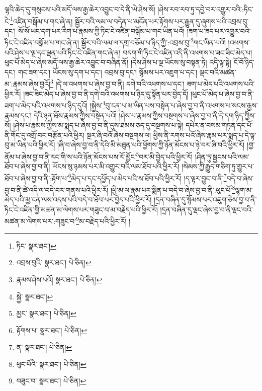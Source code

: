 ལྷའི་ཆེད་དུ་གསུངས་པའི་མདོ་ལས་རྒྱ་ཆེར་འབྱུང་བ་དེ་ནི་ཡེ་ཤེས་སོ། །ཤེས་རབ་རབ་ཏུ་དབྱེ་བར་འགྱུར་བའི་:ཏིང་ངེ་\footnote{ཏིང་  སྣར་ཐང་། }འཛིན་བསྒོམ་པ་གང་ཞེ་ན། སྦྱོར་བའི་ལམ་ལ་བདེན་པ་མངོན་པར་རྟོགས་པར་རྒྱུན་དུ་ཞུགས་པའི་འབྲས་བུ་དང་། སོ་སོ་ཡང་དག་པར་རིག་པ་རྣམས་ཀྱི་ཏིང་ངེ་འཛིན་བསྒོམ་པ་གང་ཡིན་པའོ། །ཟག་པ་ཟད་པར་འགྱུར་བའི་ཏིང་ངེ་འཛིན་བསྒོམ་པ་གང་ཞེ་ན། སྦྱོར་བའི་ལམ་ལ་དགྲ་བཅོམ་པ་ཉིད་ཀྱི་:འབྲས་བུ་\footnote{འབྲས་བུའི་  སྣར་ཐང་།  པེ་ཅིན། }གང་ཡིན་པའོ། །འཕགས་པའི་ཤེས་པ་ལྔ་དང་ལྡན་པའི་ཏིང་ངེ་འཛིན་གང་ཞེ་ན། བདག་གི་ཏིང་ངེ་འཛིན་འདི་ནི་འཕགས་པ་ཟང་ཟིང་མེད་པ། ཕུང་པོ་མེད་པ་ཞེས་མདོ་ལས་རྒྱ་ཆེར་འབྱུང་བ་བཞིན་ནོ། །དེས་ཤེས་པ་ལྔ་ཡོངས་སུ་བསྟན་ཏེ། འདི་ལྟ་སྟེ། ངོ་བོ་ཉིད་དང་། གང་ཟག་དང་། ཡོངས་སུ་དག་པ་དང་། འབྲས་བུ་དང་། སྙོམས་པར་འཇུག་པ་དང་། ལྡང་བའི་མཚན་མ་:རྣམས་ཞེས་བྱའོ།\footnote{རྣམས་ཤེས་པའོ།  སྣར་ཐང་།  པེ་ཅིན། } །དེ་ལ་འཕགས་པ་ཞེས་བྱ་བ་ནི། དགེ་བའི་འཕགས་པ་དང་། ཟག་པ་མེད་པའི་འཕགས་པའི་ཕྱིར་རོ། །ཟང་ཟིང་མེད་པ་ཞེས་བྱ་བ་ནི་དགེ་བའི་འཕགས་པ་ཉིད་དུ་སྟོན་པར་བྱེད་དོ། །ཕུང་པོ་མེད་པ་ཞེས་བྱ་བ་ནི་ཟག་པ་མེད་པའི་འཕགས་པ་ཉིད་དུའོ། །སྐྱེས་\footnote{སྐྱེ་  སྣར་ཐང་། }བུ་ངན་པ་མ་ཡིན་པས་བསྟེན་པ་ཞེས་བྱ་བ་ནི་འཕགས་པ་སངས་རྒྱས་རྣམས་དང་། དེའི་ཉན་ཐོས་རྣམས་ཀྱིས་བསྟེན་པའོ། །ཤེས་པ་རྣམས་ཀྱིས་བསྔགས་པ་ཞེས་བྱ་བ་ནི་དེ་དག་ཉིད་ཀྱིས་སོ། །ཤེས་པ་རྣམས་ཀྱིས་མ་སྨད་པ་ཞེས་བྱ་བ་ནི་དུས་ཐམས་ཅད་དུ་བསྔགས་པ་སྟེ། དཔེར་ན་བསམ་གཏན་དང་པོ་ནི་གོང་དུ་འགྲོ་བར་བརྩོན་པའི་ཕྱིར། སྔར་ཞི་བའོ་ཞེས་བསྔགས་ལ། ཕྱིས་ནི་རགས་པའོ་ཞེས་རྣམ་པར་སྨད་པ་དེ་ལྟ་བུ་མ་ཡིན་པའི་ཕྱིར་རོ། །ཞི་བ་ཞེས་བྱ་བ་ནི་དེའི་མི་མཐུན་པའི་ཕྱོགས་ཀྱི་ཉོན་མོངས་པ་ཉེ་བར་ཞི་བའི་ཕྱིར་རོ། །གྱ་ནོམ་པ་ཞེས་བྱ་བ་ནི་རང་གི་ས་པའི་ཉོན་མོངས་པས་རོ་མྱོང་\footnote{མྱང་  སྣར་ཐང་།  པེ་ཅིན། }བར་མི་བྱེད་པའི་ཕྱིར་རོ། །ཤིན་ཏུ་སྦྱངས་པའི་ལམ་ཐོབ་པ་ཞེས་བྱ་བ་ནི། ཡོངས་སུ་ཉམས་པར་མི་འགྱུར་བའི་ལམ་ཐོབ་པའི་ཕྱིར་རོ། །སེམས་ཀྱི་རྒྱུད་གཅིག་ཏུ་གྱུར་པ་ཐོབ་པ་ཞེས་བྱ་བ་ནི་:རྟོག་པ་\footnote{རྟོགས་པ་  སྣར་ཐང་།  པེ་ཅིན། }མེད་པ་དང་དཔྱོད་པ་མེད་པའི་ས་ཐོབ་པའི་ཕྱིར་རོ། །ད་ལྟར་བྱུང་བ་ནི་\footnote{ན་  སྣར་ཐང་།  པེ་ཅིན། }བདེ་བ་ཞེས་བྱ་བ་ནི་ཚེ་འདི་ལ་བདེ་བར་གནས་པའི་ཕྱིར་རོ། །ཕྱི་མ་ལ་རྣམ་པར་སྨིན་པ་བདེ་བ་ཞེས་བྱ་བ་ནི་:ཕུང་པོ་\footnote{ཕུང་པོའི་  སྣར་ཐང་།  པེ་ཅིན། }ལྷག་མ་མེད་པའི་མྱ་ངན་ལས་འདས་པའི་བདེ་བ་ཐོབ་པར་བྱེད་པའི་ཕྱིར་རོ། །དྲན་བཞིན་དུ་སྙོམས་པར་འཇུག་ཅེས་བྱ་བ་ནི་ཏིང་ངེ་འཛིན་གྱི་མཚན་མ་ལེགས་པར་གཟུང་བ་མ་བརྗེད་པའི་ཕྱིར་རོ། །དྲན་བཞིན་དུ་ལྡང་ཞེས་བྱ་བ་ནི་ལྡང་བའི་མཚན་མ་ལེགས་པར་:གཟུང་བ་\footnote{བཟུང་བ་  སྣར་ཐང་།  པེ་ཅིན། }མ་བརྗེད་པའི་ཕྱིར་རོ། །
